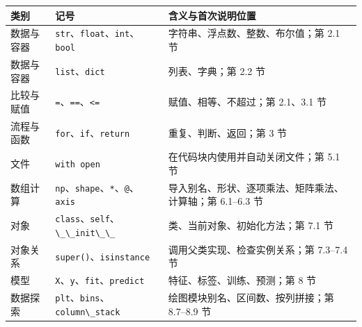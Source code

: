 \documentclass[UTF8,a4paper,11pt,fontset=fandol]{ctexart}
\providecommand{\passthrough}[1]{#1}
\begin{document}
\begin{longtable}[]{@{}
  >{\raggedright\arraybackslash}p{}
  >{\raggedright\arraybackslash}p{}
  >{\raggedright\arraybackslash}p{}@{}}
\toprule\noalign{}
\begin{minipage}[b]{\linewidth}\raggedright
类别
\end{minipage} & \begin{minipage}[b]{\linewidth}\raggedright
记号
\end{minipage} & \begin{minipage}[b]{\linewidth}\raggedright
含义与首次说明位置
\end{minipage} \\
\midrule\noalign{}
\endhead
\bottomrule\noalign{}
\endlastfoot
数据与容器 & \passthrough{\lstinline!str!}、\passthrough{\lstinline!float!}、\passthrough{\lstinline!int!}、\passthrough{\lstinline!bool!} & 字符串、浮点数、整数、布尔值；第 2.1 节 \\
数据与容器 & \passthrough{\lstinline!list!}、\passthrough{\lstinline!dict!} & 列表、字典；第 2.2 节 \\
比较与赋值 & \passthrough{\lstinline!=!}、\passthrough{\lstinline!==!}、\passthrough{\lstinline!<=!} & 赋值、相等、不超过；第 2.1、3.1 节 \\
流程与函数 & \passthrough{\lstinline!for!}、\passthrough{\lstinline!if!}、\passthrough{\lstinline!return!} & 重复、判断、返回；第 3 节 \\
文件 & \passthrough{\lstinline!with open!} & 在代码块内使用并自动关闭文件；第 5.1 节 \\
数组计算 & \passthrough{\lstinline!np!}、\passthrough{\lstinline!shape!}、\passthrough{\lstinline!*!}、\passthrough{\lstinline!@!}、\passthrough{\lstinline!axis!} & 导入别名、形状、逐项乘法、矩阵乘法、计算轴；第 6.1--6.3 节 \\
对象 & \passthrough{\lstinline!class!}、\passthrough{\lstinline!self!}、\passthrough{\lstinline!\_\_init\_\_!} & 类、当前对象、初始化方法；第 7.1 节 \\
对象关系 & \passthrough{\lstinline!super()!}、\passthrough{\lstinline!isinstance!} & 调用父类实现、检查实例关系；第 7.3--7.4 节 \\
模型 & \passthrough{\lstinline!X!}、\passthrough{\lstinline!y!}、\passthrough{\lstinline!fit!}、\passthrough{\lstinline!predict!} & 特征、标签、训练、预测；第 8 节 \\
数据探索 & \passthrough{\lstinline!plt!}、\passthrough{\lstinline!bins!}、\passthrough{\lstinline!column\_stack!} & 绘图模块别名、区间数、按列拼接；第 8.7--8.9 节 \\
\end{longtable}
\end{document}

